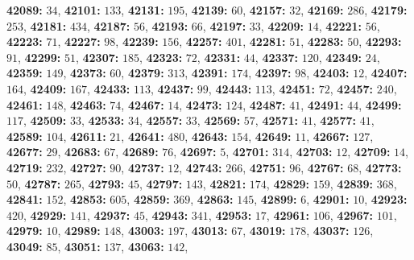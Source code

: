 \textsf{\bfseries 42089:} $34$, \textsf{\bfseries 42101:} $133$, \textsf{\bfseries 42131:} $195$, \textsf{\bfseries 42139:} $60$, \textsf{\bfseries 42157:} $32$, \textsf{\bfseries 42169:} $286$, \textsf{\bfseries 42179:} $253$, \textsf{\bfseries 42181:} $434$, \textsf{\bfseries 42187:} $56$, \textsf{\bfseries 42193:} $66$, \textsf{\bfseries 42197:} $33$, \textsf{\bfseries 42209:} $14$, \textsf{\bfseries 42221:} $56$, \textsf{\bfseries 42223:} $71$, \textsf{\bfseries 42227:} $98$, \textsf{\bfseries 42239:} $156$, \textsf{\bfseries 42257:} $401$, \textsf{\bfseries 42281:} $51$, \textsf{\bfseries 42283:} $50$, \textsf{\bfseries 42293:} $91$, \textsf{\bfseries 42299:} $51$, \textsf{\bfseries 42307:} $185$, \textsf{\bfseries 42323:} $72$, \textsf{\bfseries 42331:} $44$, \textsf{\bfseries 42337:} $120$, \textsf{\bfseries 42349:} $24$, \textsf{\bfseries 42359:} $149$, \textsf{\bfseries 42373:} $60$, \textsf{\bfseries 42379:} $313$, \textsf{\bfseries 42391:} $174$, \textsf{\bfseries 42397:} $98$, \textsf{\bfseries 42403:} $12$, \textsf{\bfseries 42407:} $164$, \textsf{\bfseries 42409:} $167$, \textsf{\bfseries 42433:} $113$, \textsf{\bfseries 42437:} $99$, \textsf{\bfseries 42443:} $113$, \textsf{\bfseries 42451:} $72$, \textsf{\bfseries 42457:} $240$, \textsf{\bfseries 42461:} $148$, \textsf{\bfseries 42463:} $74$, \textsf{\bfseries 42467:} $14$, \textsf{\bfseries 42473:} $124$, \textsf{\bfseries 42487:} $41$, \textsf{\bfseries 42491:} $44$, \textsf{\bfseries 42499:} $117$, \textsf{\bfseries 42509:} $33$, \textsf{\bfseries 42533:} $34$, \textsf{\bfseries 42557:} $33$, \textsf{\bfseries 42569:} $57$, \textsf{\bfseries 42571:} $41$, \textsf{\bfseries 42577:} $41$, \textsf{\bfseries 42589:} $104$, \textsf{\bfseries 42611:} $21$, \textsf{\bfseries 42641:} $480$, \textsf{\bfseries 42643:} $154$, \textsf{\bfseries 42649:} $11$, \textsf{\bfseries 42667:} $127$, \textsf{\bfseries 42677:} $29$, \textsf{\bfseries 42683:} $67$, \textsf{\bfseries 42689:} $76$, \textsf{\bfseries 42697:} $5$, \textsf{\bfseries 42701:} $314$, \textsf{\bfseries 42703:} $12$, \textsf{\bfseries 42709:} $14$, \textsf{\bfseries 42719:} $232$, \textsf{\bfseries 42727:} $90$, \textsf{\bfseries 42737:} $12$, \textsf{\bfseries 42743:} $266$, \textsf{\bfseries 42751:} $96$, \textsf{\bfseries 42767:} $68$, \textsf{\bfseries 42773:} $50$, \textsf{\bfseries 42787:} $265$, \textsf{\bfseries 42793:} $45$, \textsf{\bfseries 42797:} $143$, \textsf{\bfseries 42821:} $174$, \textsf{\bfseries 42829:} $159$, \textsf{\bfseries 42839:} $368$, \textsf{\bfseries 42841:} $152$, \textsf{\bfseries 42853:} $605$, \textsf{\bfseries 42859:} $369$, \textsf{\bfseries 42863:} $145$, \textsf{\bfseries 42899:} $6$, \textsf{\bfseries 42901:} $10$, \textsf{\bfseries 42923:} $420$, \textsf{\bfseries 42929:} $141$, \textsf{\bfseries 42937:} $45$, \textsf{\bfseries 42943:} $341$, \textsf{\bfseries 42953:} $17$, \textsf{\bfseries 42961:} $106$, \textsf{\bfseries 42967:} $101$, \textsf{\bfseries 42979:} $10$, \textsf{\bfseries 42989:} $148$, \textsf{\bfseries 43003:} $197$, \textsf{\bfseries 43013:} $67$, \textsf{\bfseries 43019:} $178$, \textsf{\bfseries 43037:} $126$, \textsf{\bfseries 43049:} $85$, \textsf{\bfseries 43051:} $137$, \textsf{\bfseries 43063:} $142$, 
